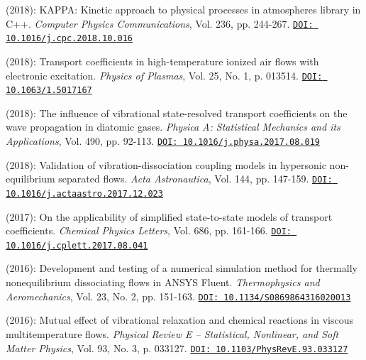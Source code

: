 \begin{enumerate}
 (2018): KAPPA: Kinetic approach to physical processes in atmospheres library in C++. \textit{Computer Physics Communications}, Vol. 236, pp. 244-267.\newline
    \href{https://doi.org/10.1016/j.cpc.2018.10.016}{\texttt{DOI: 10.1016/j.cpc.2018.10.016}}

 (2018): Transport coefficients in high-temperature ionized air flows with electronic excitation. \textit{Physics of Plasmas}, Vol. 25, No. 1, p. 013514.\newline
    \href{https://doi.org/10.1063/1.5017167}{\texttt{DOI: 10.1063/1.5017167}}

 (2018): The influence of vibrational state-resolved transport coefficients on the wave propagation in diatomic gases. \textit{Physica A: Statistical Mechanics and its Applications}, Vol. 490, pp. 92-113.\newline
    \href{https://doi.org/10.1016/j.physa.2017.08.019}{\texttt{DOI: 10.1016/j.physa.2017.08.019}}

 (2018): Validation of vibration-dissociation coupling models in hypersonic non-equilibrium separated flows. \textit{Acta Astronautica}, Vol. 144, pp. 147-159.\newline
    \href{https://doi.org/10.1016/j.actaastro.2017.12.023}{\texttt{DOI: 10.1016/j.actaastro.2017.12.023}}

 (2017): On the applicability of simplified state-to-state models of transport coefficients. \textit{Chemical Physics Letters}, Vol. 686, pp. 161-166.\newline
    \href{https://doi.org/10.1016/j.cplett.2017.08.041}{\texttt{DOI: 10.1016/j.cplett.2017.08.041}}

 (2016): Development and testing of a numerical simulation method for thermally nonequilibrium dissociating flows in ANSYS Fluent. \textit{Thermophysics and Aeromechanics}, Vol. 23, No. 2, pp. 151-163.\newline
    \href{https://doi.org/10.1134/S0869864316020013}{\texttt{DOI: 10.1134/S0869864316020013}}

 (2016): Mutual effect of vibrational relaxation and chemical reactions in viscous multitemperature flows. \textit{Physical Review E -- Statistical, Nonlinear, and Soft Matter Physics}, Vol. 93, No. 3, p. 033127.\newline
    \href{https://doi.org/10.1103/PhysRevE.93.033127}{\texttt{DOI: 10.1103/PhysRevE.93.033127}}


\end{enumerate}
